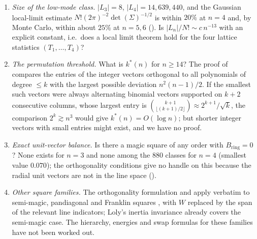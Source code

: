 \begin{enumerate}\setlength\itemsep{1pt}
\item \emph{Size of the low-mode class.} $|L_3|=8$, $|L_4|=14{,}639{,}440$, and the Gaussian local-limit estimate $N!(2\pi)^{-2}\det(\Sigma)^{-1/2}$ is within $20\%$ at $n=4$ and, by Monte Carlo, within about $25\%$ at $n=5,6$ (). Is $|L_n|/N!\sim c\,n^{-13}$ with an explicit constant, i.e.\ does a local limit theorem hold for the four lattice statistics $(T_1,\dots,T_4)$?
\item \emph{The permutation threshold.} What is $k^*(n)$ for $n\ge14$? The proof of  compares the entries of the integer vectors orthogonal to all polynomials of degree $\le k$ with the largest possible deviation $n^2(n-1)/2$. If the smallest such vectors were always alternating binomial vectors supported on $k+2$ consecutive columns, whose largest entry is $\binom{k+1}{\lfloor(k+1)/2\rfloor}\approx2^{k+1}/\sqrt k$, the comparison $2^k\gtrsim n^3$ would give $k^*(n)=O(\log n)$; but shorter integer vectors with small entries might exist, and we have no proof.
\item \emph{Exact unit-vector balance.} Is there a magic square of any order with $B_{\mathrm{ring}}=0$? None exists for $n=3$ and none among the $880$ classes for $n=4$ (smallest value $0.070$); the orthogonality conditions give no handle on this because the radial unit vectors are not in the line space ().
\item \emph{Other square families.} The orthogonality formulation and  apply verbatim to semi-magic, pandiagonal and Franklin squares \cite{loly2007franklin}, with $W$ replaced by the span of the relevant line indicators; Loly's inertia invariance already covers the semi-magic case. The hierarchy, energies and swap formulas for these families have not been worked out.
\end{enumerate}
